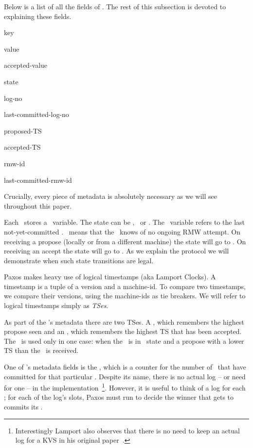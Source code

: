 \custvspace
{}
Below is a list of all the fields of \kv. The rest of this subsection is devoted to explaining these fields.
\squishenum
\item key
\item value
\item accepted-value
\item state
\item log-no
\item last-committed-log-no
\item proposed-TS
\item accepted-TS
\item rmw-id
\item last-committed-rmw-id
\squishenumend

\custvspace
Crucially, every piece of metadata is absolutely necessary as we will see throughout this paper.

\custvspace
{}
Each \kv\ stores a \state\ variable. The state can be \invalid, \proped\ or \acced.
The \state\ variable refers to the last not-yet-committed \logno. 
\invalid\ means that the \kv~knows of no ongoing RMW attempt. On receiving a propose (locally or from a different machine) the state will go to \proped. On receiving an accept the state will go to \acced. As we explain the protocol we will demonstrate when such state transitions are legal.

\custvspace
{}
Paxos makes heavy use of logical timestamps (aka Lamport Clocks). A timestamp is a tuple of a version and a machine-id. To compare two timestamps, we compare their versions, using the machine-ids as tie breakers. We will refer to logical timestamps simply as \emph{TSes}.


\custvspace
{}
As part of the \kv's metadata there are two TSes. A \propts, which remembers the highest propose seen and an \accts, which remembers the highest TS that has been accepted. The \accts\ is used only in one case: when the \kv~is in \acced\ state and a propose with a lower TS than the \accts\ is received.


\custvspace
{}
One of \kv's metadata fields is the \logno, which is a counter for the number of \RMWs\ that have committed for that particular \kv. Despite its name, there is no actual log -- or need for one -- in the implementation~\footnote{Interestingly Lamport also observes that there is no need to keep an actual log for a KVS in his original paper~\cite{Lamport:1998}.}. However, it is useful to think of a log for each \kv; for each of the log's slots, Paxos must run to decide the winner that gets to commits its \RMW. 

